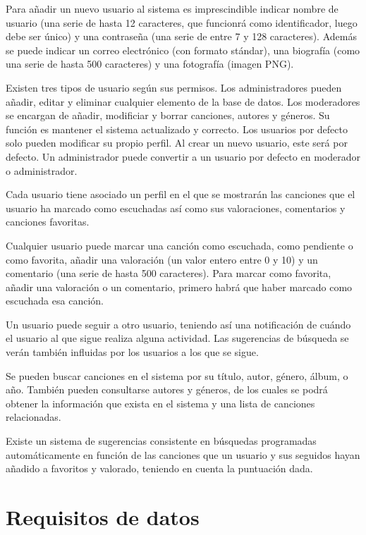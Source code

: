 \documentclass[
  12pt,
  a4paper,
  DIV=12,
  spanish,
]{scrartcl}
\begin{document}
Para añadir un nuevo usuario al sistema es imprescindible indicar nombre de usuario (una serie de hasta 12 caracteres, que funcionrá como identificador, luego debe ser único) y una contraseña (una serie de entre 7 y 128 caracteres). Además se puede indicar un correo electrónico (con formato stándar), una biografía (como una serie de hasta 500 caracteres) y una fotografía (imagen PNG).

Existen tres tipos de usuario según sus permisos. Los administradores pueden añadir, editar y eliminar cualquier elemento de la base de datos. Los moderadores se encargan de añadir, modificiar y borrar canciones, autores y géneros. Su función es mantener el sistema actualizado y correcto. Los usuarios por defecto solo pueden modificar su propio perfil. Al crear un nuevo usuario, este será por defecto. Un administrador puede convertir a un usuario por defecto en moderador o administrador.

Cada usuario tiene asociado un perfil en el que se mostrarán las canciones que el usuario ha marcado como escuchadas así como sus valoraciones, comentarios y canciones favoritas.


Cualquier usuario puede marcar una canción como escuchada, como pendiente o como favorita, añadir una valoración (un valor entero entre 0 y 10) y un comentario (una serie de hasta 500 caracteres). Para marcar como favorita, añadir una valoración o un comentario, primero habrá que haber marcado como escuchada esa canción.

Un usuario puede seguir a otro usuario, teniendo así una notificación de cuándo el usuario al que sigue realiza alguna actividad. Las sugerencias de búsqueda se verán también influidas por los usuarios a los que se sigue.



Se pueden buscar canciones en el sistema por su título, autor, género, álbum, o año. También pueden consultarse autores y géneros, de los cuales se podrá obtener la información que exista en el sistema y una lista de canciones relacionadas.

Existe un sistema de sugerencias consistente en búsquedas programadas automáticamente en función de las canciones que un usuario y sus seguidos hayan añadido a favoritos y valorado, teniendo en cuenta la puntuación dada.

\section{Requisitos de datos}
\end{document}
